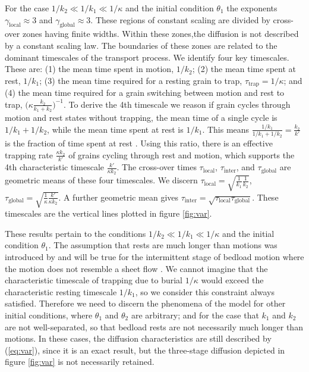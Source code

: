 \documentclass[]{agujournal2018}
\begin{document}
For the case $1/k_2 \ll 1/k_1 \ll 1/\kappa$ and the initial condition $\theta_1$ the exponents $\gamma_\text{local} \approx 3$ and $\gamma_\text{global} \approx 3$.
These regions of constant scaling are divided by cross-over zones having finite widths.
Within these zones,the diffusion is not described by a constant scaling law.
The boundaries of these zones are related to the dominant timescales of the transport process.
We identify four key timescales.
These are: (1) the mean time spent in motion, $1/k_2$; (2) the mean time spent at rest, $1/k_1$; (3) the mean time required for a resting grain to trap, $\tau_\text{trap}=1/\kappa$; and (4) the mean time required for a grain switching between motion and rest to trap, $\big(\kappa \frac{k_2}{k_1+k_2}\big)^{-1}$.
To derive the 4th timescale we reason if grain cycles through motion and rest states without trapping, the mean time of a single cycle is $1/k_1 + 1/k_2$, while the mean time spent at rest is $1/k_1$. This means $\frac{1/k_1}{1/k_1 + 1/k_2} = \frac{k_2}{k'}$ is the fraction of time spent at rest \citep[c.f.][]{Ancey2006}. Using this ratio, there is an effective trapping rate $\frac{\kappa k_2}{k'}$ of grains cycling through rest and motion, which supports the 4th characteristic timescale $\frac{k'}{\kappa k_2}$.
The cross-over times $\tau_\text{local}$, $\tau_\text{inter}$, and $\tau_\text{global}$ are geometric means of these four timescales.
We discern $\tau_\text{local} = \sqrt{\frac{1}{k_1}\frac{1}{k_2}}$, $\tau_\text{global} = \sqrt{\frac{1}{\kappa} \frac{k'}{\kappa k_2}}$.
A further geometric mean gives $\tau_\text{inter} = \sqrt{\tau_\text{local}\tau_\text{global}}$.
These timescales are the vertical lines plotted in figure \ref{fig:var}.

These results pertain to the conditions $1/k_2 \ll 1/k_1 \ll 1/\kappa$ and the initial condition $\theta_1$.
The assumption that rests are much longer than motions was introduced by \citet{Einstein1937} and will be true for the intermittent stage of bedload motion \citep[e.g.][]{Nikora2001,Heyman2016} where the motion does not resemble a sheet flow \citep{Frey2014}.
We cannot imagine that the characteristic timescale of trapping due to burial $1/\kappa$ would exceed the characteristic resting timescale $1/k_1$, so we consider this constraint always satisfied.
Therefore we need to discern the phenomena of the model for other initial conditions, where $\theta_1 $ and $\theta_2$ are arbitrary; and for the case that $k_1$ and $k_2$ are not well-separated, so that bedload rests are not necessarily much longer than motions.
In these cases, the diffusion characteristics are still described by (\ref{eq:var}), since it is an exact result, but the three-stage diffusion depicted in figure \ref{fig:var} is not necessarily retained.
\end{document}
